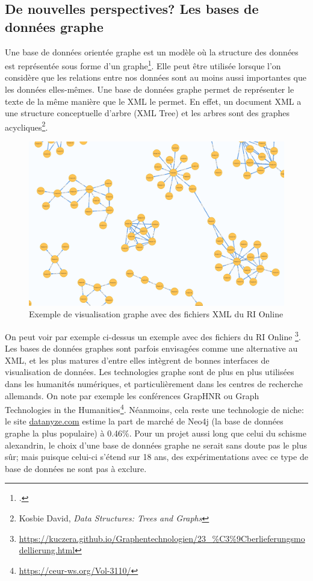     
    \subsection{De nouvelles perspectives? Les bases de données graphe}

Une base de données orientée graphe est un modèle où la structure des données est représentée sous forme d’un graphe\footcite{angles_survey_2008}. Elle peut être utilisée lorsque l’on considère que les relations entre nos données sont au moins aussi importantes que les données elles-mêmes. Une base de données graphe permet de représenter le texte de la même manière que le XML le permet. En effet, un document XML a une structure conceptuelle d’arbre (XML Tree) et les arbres sont des graphes acycliques\footnote{Kosbie David, \textit{Data Structures: Trees and Graphs}}. 


\begin{figure}[H]
    \centering
    \includegraphics[width=14cm]{images/RI_graph.png}
    \caption{Exemple de visualisation graphe avec des fichiers XML du RI Online}
    \label{fig:ExempleGraph}
\end{figure}

On peut voir par exemple ci-dessus un exemple avec des fichiers du RI Online \footnote{\url{https://kuczera.github.io/Graphentechnologien/23_\%C3\%9Cberlieferungsmodellierung.html}}. Les bases de données graphes sont parfois envisagées comme une alternative au XML, et les plus matures d’entre elles intègrent  de bonnes interfaces de visualisation de données. Les technologies graphe sont de plus en plus utilisées dans les humanités numériques, et particulièrement dans les centres de recherche allemands. On note par exemple les conférences  GrapHNR ou Graph Technologies in the Humanities\footnote{\url{ https://ceur-ws.org/Vol-3110/}}. Néanmoins, cela reste une technologie de niche: le site \url{datanyze.com} estime la part de marché de Neo4j (la base de données graphe la plus populaire) à 0.46\%. Pour un projet aussi long que celui du schisme alexandrin, le choix d’une base de données graphe ne serait sans doute pas le plus sûr; mais puisque celui-ci s’étend sur 18 ans, des expérimentations avec ce type de base de données ne sont pas à exclure.



